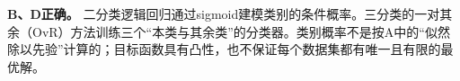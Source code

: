 \textbf{B、D正确。} 二分类逻辑回归通过sigmoid建模类别的条件概率。三分类的一对其余（OvR）方法训练三个“本类与其余类”的分类器。类别概率不是按A中的“似然除以先验”计算的；目标函数具有凸性，也不保证每个数据集都有唯一且有限的最优解。
